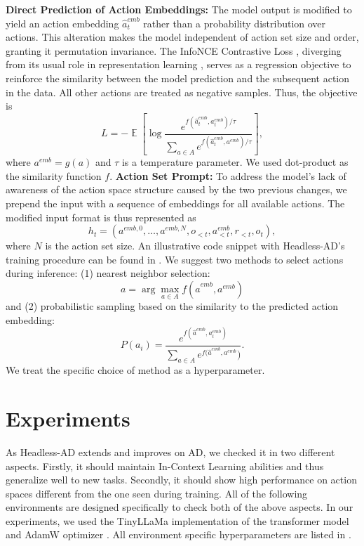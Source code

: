 \documentclass{article}
\theoremstyle{plain}
\theoremstyle{definition}
\theoremstyle{remark}
\begin{document}
\textbf{Direct Prediction of Action Embeddings:} The model output is modified to yield an action embedding $\hat{a}^{emb}_t$ rather than a probability distribution over actions. This alteration makes the model independent of action set size and order, granting it permutation invariance. The InfoNCE Contrastive Loss \citep{oord2018representation}, diverging from its usual role in representation learning \citep{jaiswal2020survey}, serves as a regression objective to reinforce the similarity between the model prediction and the subsequent action in the data. All other actions are treated as negative samples. Thus, the objective is
\[
L = -\mathop{\mathbb{E}}\left[{\log{\frac{e^{f(\hat{a}^{emb}_t, a^{emb}_t) / \tau}}{\sum_{a \in A}{e^{f(\hat{a}^{emb}_t, a^{emb}) / \tau}}}}}\right],
\]
where $a^{emb} = g(a)$ and $\tau$ is a temperature parameter. We used dot-product as the similarity function $f$.
\textbf{Action Set Prompt:} To address the model's lack of awareness of the action space structure caused by the two previous changes, we prepend the input with a sequence of embeddings for all available actions.
The modified input format is thus represented as
\[
h_t = \left(a^{emb,0}, \dots, a^{emb,N}, o_{<t}, a^{emb}_{<t}, r_{<t}, o_t\right),
\]
where $N$ is the action set size. An illustrative code snippet with Headless-AD's training procedure can be found in .
\newline
\newline
We suggest two methods to select actions during inference: (1) nearest neighbor selection:
\[
a = \arg \max_{a \in A} f(\hat{a}^{emb}, a^{emb})
\]
and (2) probabilistic sampling based on the similarity to the predicted action embedding:
\[
P(a_i) = \frac{e^{f(\hat{a}^{emb}, a^{emb}_i)}}{\sum_{a \in A}{e^{f(\hat{a}^{emb}, a^{emb}}})}.
\]
We treat the specific choice of method as a hyperparameter.
\section{Experiments}
\label{section:experiments}
As Headless-AD extends and improves on AD, we checked it in two different aspects. Firstly, it should maintain In-Context Learning abilities and thus generalize well to new tasks. Secondly, it should show high performance on action spaces different from the one seen during training. All of the following environments are designed specifically to check both of the above aspects. In our experiments, we used the TinyLLaMa \citep{zhang2024tinyllama} implementation of the transformer model and AdamW optimizer \citep{loshchilov2017decoupled}. All environment specific hyperparameters are listed in .
\end{document}
